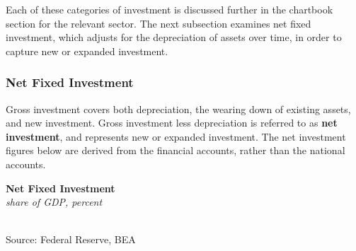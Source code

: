 \documentclass{report}
\makeatletter
\newcommand{\tbllink}[1]{\href{https://raw.githubusercontent.com/bdecon/US-chartbook/master/chartbook/data/#1}{\faTable}}
\newcommand*\short[1]{\expandafter\@gobbletwo\number\numexpr#1\relax}
\newcommand{\absnode}[3]{\node[below right, align=left] at (axis cs: #1,#2) {#3};}
\newcommand{\shdateaxisticks}{
		date coordinates in=x, axis line style={draw=none},
		xmax={2023-10-01},
		max space between ticks=40,	    
		xtick={{1990-01-01}, {1995-01-01}, {2000-01-01}, 
			{2005-01-01}, {2010-01-01}, {2015-01-01}, {2020-01-01}},
		minor xtick={},
		enlarge y limits={0.06}, enlarge x limits={0.01},
		}
\newcommand{\bbar}[2]{extra #1 ticks = {{#2}}, extra #1 tick labels = ,
		extra #1 tick style = {grid=major, grid style={thick, black!25}},}
\newcommand{\stdline}[4]{\addplot[very thick, no markers, color=#1] 
		table [x=#2, y=#3, col sep=comma] {#4};	}
\newcommand{\rbars}{
		\fill[color=black!10] (axis cs:{1990-07-01},\pgfkeysvalueof{/pgfplots/ymin}) rectangle 
			(axis cs:{1991-03-01}, \pgfkeysvalueof{/pgfplots/ymax});
		\fill[color=black!10] (axis cs:{2007-12-01},\pgfkeysvalueof{/pgfplots/ymin}) rectangle 
			(axis cs:{2009-07-01}, \pgfkeysvalueof{/pgfplots/ymax});
		\fill[color=black!10] (axis cs:{2001-03-01},\pgfkeysvalueof{/pgfplots/ymin}) rectangle 
			(axis cs:{2001-11-01}, \pgfkeysvalueof{/pgfplots/ymax});
		\fill[color=black!10] (axis cs:{2020-02-01},\pgfkeysvalueof{/pgfplots/ymin}) rectangle 
			(axis cs:{2020-05-01}, \pgfkeysvalueof{/pgfplots/ymax});}
\makeatother
\begin{document}
{\begin{minipage}{0.76\textwidth}
 

Each of these categories of investment is discussed further in the chartbook section for the relevant sector. The next subsection examines net fixed investment, which adjusts for the depreciation of assets over time, in order to capture new or expanded investment. 
\end{minipage}
\newpage
\vspace*{-9mm}

\begin{minipage}{0.76\textwidth} 
\subsubsection*{Net Fixed Investment}
\vspace{-1mm}
\small Gross investment covers both depreciation, the wearing down of existing assets, and new investment. Gross investment less depreciation is referred to as \textbf{net investment}, and represents new or expanded investment. The net investment figures below are derived from the financial accounts, rather than the national accounts. 

\begin{minipage}{0.445\textwidth}
\small 
\end{minipage} \hspace{5mm} \begin{minipage}{0.5\textwidth}
\normalsize \textbf{Net Fixed Investment}\\
\footnotesize{\textit{share of GDP, percent}}\\
\hspace*{-2mm} \\
\footnotesize{Source: Federal Reserve, BEA} \hfill \tbllink{z1_nfi.csv} \ \ 
\end{minipage}


\end{minipage}}
\end{document}
